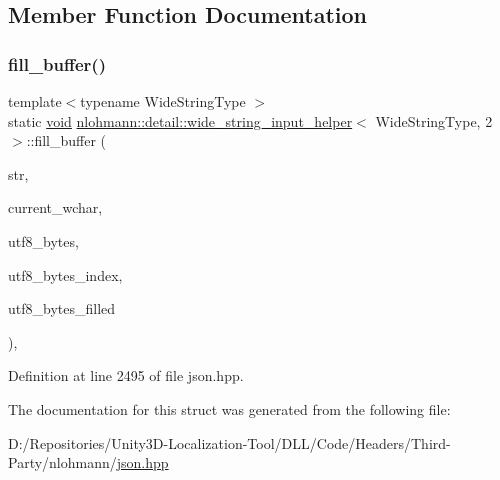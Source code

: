 \subsection{Member Function Documentation}
\mbox{\label{structnlohmann_1_1detail_1_1wide__string__input__helper_3_01_wide_string_type_00_012_01_4_a7ede7749f186f1a6a46c08abb607fd5c}} 
\subsubsection{\texorpdfstring{fill\_buffer()}{fill\_buffer()}}
{\footnotesize\ttfamily template$<$typename Wide\+String\+Type $>$ \\
static \mbox{\hyperlink{namespacenlohmann_1_1detail_a59fca69799f6b9e366710cb9043aa77d}{void}} \mbox{\hyperlink{structnlohmann_1_1detail_1_1wide__string__input__helper}{nlohmann\+::detail\+::wide\+\_\+string\+\_\+input\+\_\+helper}}$<$ Wide\+String\+Type, 2 $>$\+::fill\+\_\+buffer (\begin{DoxyParamCaption}\item[{const Wide\+String\+Type \&}]{str,  }\item[{size\+\_\+t \&}]{current\+\_\+wchar,  }\item[{\mbox{\hyperlink{namespacenlohmann_1_1detail_a1ed8fc6239da25abcaf681d30ace4985af1f713c9e000f5d3f280adbd124df4f5}{std\+::array}}$<$ std\+::char\+\_\+traits$<$ char $>$\+::int\+\_\+type, 4 $>$ \&}]{utf8\+\_\+bytes,  }\item[{size\+\_\+t \&}]{utf8\+\_\+bytes\+\_\+index,  }\item[{size\+\_\+t \&}]{utf8\+\_\+bytes\+\_\+filled }\end{DoxyParamCaption})\hspace{0.3cm}{\ttfamily [inline]}, {\ttfamily [static]}}



Definition at line 2495 of file json.\+hpp.



The documentation for this struct was generated from the following file\+:\begin{DoxyCompactItemize}
\item 
D\+:/\+Repositories/\+Unity3\+D-\/\+Localization-\/\+Tool/\+D\+L\+L/\+Code/\+Headers/\+Third-\/\+Party/nlohmann/\mbox{\hyperlink{json_8hpp}{json.\+hpp}}\end{DoxyCompactItemize}
